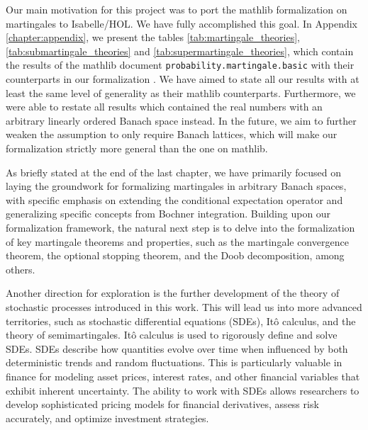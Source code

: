 Our main motivation for this project was to port the \textsf{mathlib} formalization on martingales to Isabelle/HOL. We have fully accomplished this goal. In Appendix \ref{chapter:appendix}, we present the tables \ref{tab:martingale_theories}, \ref{tab:submartingale_theories} and \ref{tab:supermartingale_theories}, which contain the results of the \textsf{mathlib} document \texttt{probability.mar\-tingale.basic} \cite{Degenne_Ying_2022} with their counterparts in our formalization \cite{Keskin_A_Formalization_of_2023}. We have aimed to state all our results with at least the same level of generality as their \textsf{mathlib} counterparts. Furthermore, we were able to restate all results which contained the real numbers with an arbitrary linearly ordered Banach space instead. In the future, we aim to further weaken the assumption to only require Banach lattices, which will make our formalization strictly more general than the one on \textsf{mathlib}.

As briefly stated at the end of the last chapter, we have primarily focused on laying the groundwork for formalizing martingales in arbitrary Banach spaces, with specific emphasis on extending the conditional expectation operator and generalizing specific concepts from Bochner integration. Building upon our formalization framework, the natural next step is to delve into the formalization of key martingale theorems and properties, such as the martingale convergence theorem, the optional stopping theorem, and the Doob decomposition, among others. 

Another direction for exploration is the further development of the theory of stochastic processes introduced in this work. This will lead us into more advanced territories, such as stochastic differential equations (SDEs), It\^o calculus, and the theory of semimartingales. It\^o calculus is used to rigorously define and solve SDEs. SDEs describe how quantities evolve over time when influenced by both deterministic trends and random fluctuations. This is particularly valuable in finance for modeling asset prices, interest rates, and other financial variables that exhibit inherent uncertainty. The ability to work with SDEs allows researchers to develop sophisticated pricing models for financial derivatives, assess risk accurately, and optimize investment strategies.

